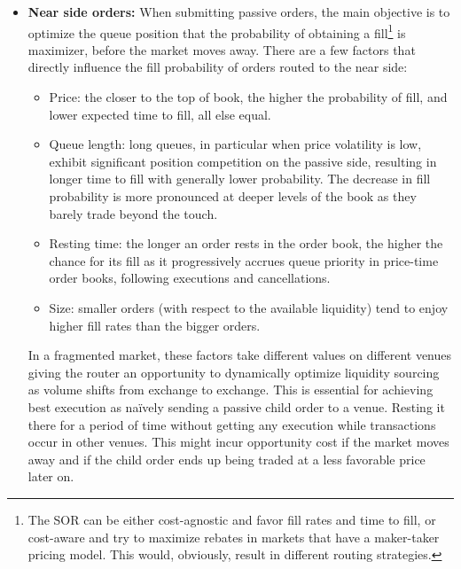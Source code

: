 \begin{itemize}
\item \textbf{Near side orders:} When submitting passive orders, the main objective is to optimize the queue position that the probability of obtaining a fill\footnote{The SOR can be either cost-agnostic and favor fill rates and time to fill, or cost-aware and try to maximize rebates in markets that have a maker-taker pricing model. This would, obviously, result in different routing strategies.} is maximizer, before the market moves away. There are a few factors that directly influence the fill probability of orders routed to the near side:


\begin{itemize}
\item Price: the closer to the top of book, the higher the probability of fill, and lower expected time to fill, all else equal.

\item Queue length: long queues, in particular when price volatility is low, exhibit significant position competition on the passive side, resulting in longer time to fill with generally lower probability. The decrease in fill probability is more pronounced at deeper levels of the book as they barely trade beyond the touch. 

\item Resting time: the longer an order rests in the order book, the higher the chance for its fill as it progressively accrues queue priority in price-time order books, following executions and cancellations.

\item Size: smaller orders (with respect to the available liquidity) tend to enjoy higher fill rates than the bigger orders.
\end{itemize}


In a fragmented market, these factors take different values on different venues giving the router an opportunity to dynamically optimize liquidity sourcing as volume shifts from exchange to exchange. This is essential for achieving best execution as na\"ively  sending a passive child order to a venue. Resting it there for a period of time without getting any execution while transactions occur in other venues. This might incur opportunity cost if the market moves away and if the child order ends up being traded at a less favorable price later on. \twomedskip



\end{itemize}

